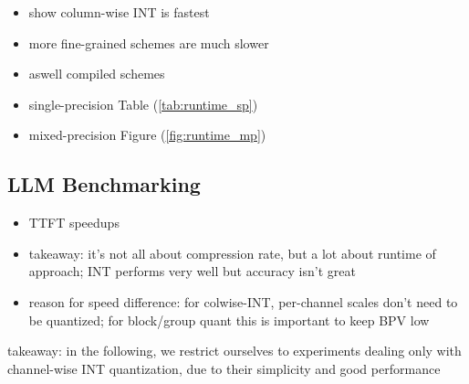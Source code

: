 \begin{itemize}
    \item show column-wise INT is fastest
    \item more fine-grained schemes are much slower
    \item aswell compiled schemes
	\item single-precision Table (\ref{tab:runtime_sp})
	\item mixed-precision Figure (\ref{fig:runtime_mp})
\end{itemize}



\subsection{LLM Benchmarking}
\begin{itemize}
	\item TTFT speedups
	\item takeaway: it's not all about compression rate, but a lot about runtime of approach; INT performs very well but accuracy isn't great
    \item reason for speed difference: for colwise-INT, per-channel scales don't need to be quantized; for block/group quant this is important to keep BPV low
\end{itemize}
takeaway: in the following, we restrict ourselves to experiments dealing only with channel-wise INT quantization, due to their simplicity and good performance


